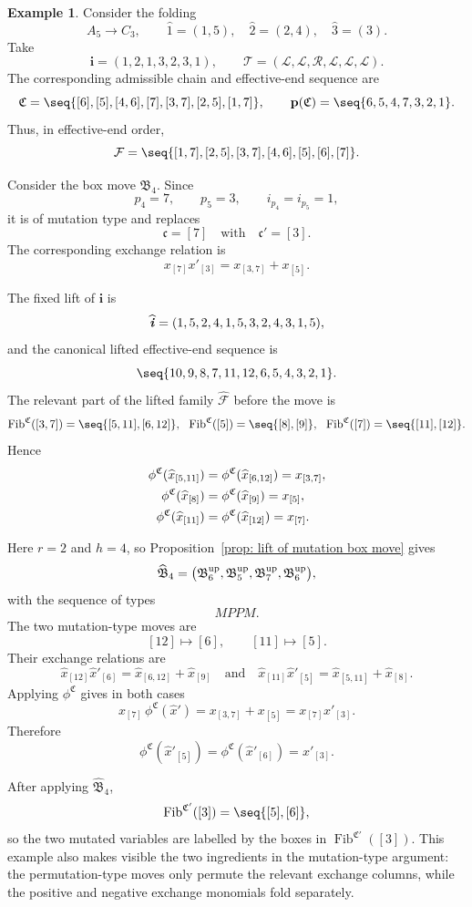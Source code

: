 \documentclass[12pt, leqno]{amsart}
\numberwithin{equation}{section}
\theoremstyle{plain}
\theoremstyle{definition}
\newtheorem{example}[lemma]{Example}
\newcommand{\up}{{\rm up}}
\newcommand{\ii}{ \textbf{\textit{i}}}
\newcommand{\Fib}{\operatorname{Fib}}
\newcommand{\hx}{\widehat{x}}
\newcommand{\hii}{{\widehat{\ii}}}
\newcommand{\frakB}{\mathfrak{B}}
\newcommand{\frakC}{\mathfrak{C}}
\newcommand{\frakc}{\mathfrak{c}}
\newcommand{\bfi}{\mathbf{i}}
\newcommand{\bfp}{\mathbf{p}}
\newcommand{\calF}{\mathcal{F}}
\newcommand{\calL}{\mathcal{L}}
\newcommand{\calR}{\mathcal{R}}
\newcommand{\calT}{\mathcal{T}}
\newcommand{\hcalF}{{\widehat{\calF}}}
\newcommand{\hfrakB}{\widehat{\frakB}}
\newcommand{\qtq}[1][{and}]{\quad\text{{#1}}\quad}
\begin{document}
\begin{example}\label{ex: ibox cluster folding A5 C3}
Consider the folding
\[
A_5\longrightarrow C_3,
\qquad
\widehat 1=(1,5),\quad \widehat 2=(2,4),\quad \widehat 3=(3).
\]
Take
\[
\bfi=(1,2,1,3,2,3,1),
\qquad
\calT=(\calL,\calL,\calR,\calL,\calL,\calL).
\]
The corresponding admissible chain and effective-end sequence are
\[
\frakC = \seq{[6],[5],[4,6],[7],[3,7],[2,5],[1,7]},
\qquad
\bfp(\frakC)=\seq{6,5,4,7,3,2,1}.
\]
Thus, in effective-end order,
\[
\calF = \seq{ [1,7],[2,5],[3,7],[4,6],[5],[6],[7] }.
\]

Consider the  box move $\frakB_4$. Since
\[
p_4=7,\qquad p_5=3,\qquad i_{p_4}=i_{p_5}=1,
\]
it is of mutation type and replaces
\[
\frakc=[7] \quad \text{with} \quad 
\frakc'=[3].
\]
The corresponding exchange relation is
\[
x_{[7]}x'_{[3]} = x_{[3,7]}+x_{[5]}.
\]

The fixed lift of $\bfi$ is
\[
\hii=(1,5,2,4,1,5,3,2,4,3,1,5),
\]
and the canonical lifted effective-end sequence is
\[
\seq{10,9,8,7,11,12,6,5,4,3,2,1}.
\]
The relevant part of  the lifted family $\hcalF$ before the move  is
\[
\Fib^{\frakC}([3,7]) = \seq{[5,11],[6,12]}, \ \ \Fib^{\frakC}([5])  = \seq{[8],[9]}, \ \  \Fib^{\frakC}([7]) = \seq{[11],[12]}.
\]
Hence
\begin{align*}
\phi^\frakC(\hx_{[5,11]}) &=\phi^\frakC(\hx_{[6,12]})=x_{[3,7]},\allowdisplaybreaks\\
\phi^\frakC(\hx_{[8]}) &=\phi^\frakC(\hx_{[9]})=x_{[5]},\allowdisplaybreaks\\
\phi^\frakC(\hx_{[11]}) &=\phi^\frakC(\hx_{[12]})=x_{[7]}.
\end{align*}

Here $r=2$ and $h=4$, so
Proposition~\ref{prop: lift of mutation box move} gives
\[
\hfrakB_4 = \bigl( \frakB^\up_6,\frakB^\up_5, \frakB^\up_7,\frakB^\up_6 \bigr),
\]
with the sequence of types \[
MPPM.
\]
The two mutation-type moves are
\[
[12]\longmapsto[6], \qquad [11]\longmapsto[5].
\]
Their exchange relations are
\[
\hx_{[12]}\hx'_{[6]} = \hx_{[6,12]}+\hx_{[9]}
\qtq
\hx_{[11]}\hx'_{[5]} = \hx_{[5,11]}+\hx_{[8]}.
\]
Applying $\phi^\frakC$ gives in both cases
\[
x_{[7]}\, \phi^\frakC(\hx') = x_{[3,7]}+x_{[5]} = x_{[7]}x'_{[3]}.
\]
Therefore
\[
\phi^\frakC(\hx'_{[5]}) = \phi^\frakC(\hx'_{[6]}) = x'_{[3]}.
\]

 After applying $\hfrakB_4$,
\[
\Fib^{\frakC'}([3]) = \seq{[5],[6]},
\]
so the two mutated variables are labelled by the boxes in
$\Fib^{\frakC'}([3])$.
This example also makes visible the
two ingredients in the mutation-type argument: the
permutation-type moves only permute the relevant exchange columns,
while the positive and negative exchange monomials fold separately.
\end{example}
\end{document}
